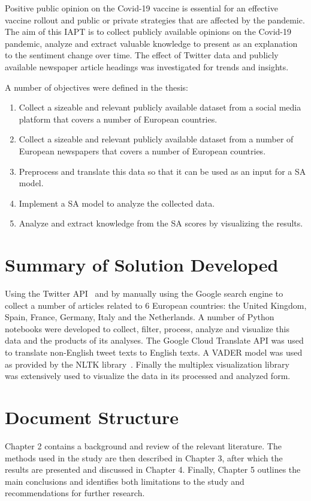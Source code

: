 Positive public opinion on the Covid-19 vaccine is essential for an effective vaccine rollout and public or private strategies that are affected by the pandemic.
The aim of this \ac{IAPT} is to collect publicly available opinions on the Covid-19 pandemic, analyze and extract valuable knowledge to present as an explanation to the sentiment change over time.
The effect of Twitter data and publicly available newspaper article headings was investigated for trends and insights.

\noindent A number of objectives were defined in the thesis:

\begin{enumerate}
  \item Collect a sizeable and relevant publicly available dataset from a social media platform that covers a number of European countries.
  \item Collect a sizeable and relevant publicly available dataset from a number of European newspapers that covers a number of European countries.
  \item Preprocess and translate this data so that it can be used as an input for a \ac{SA} model.
  \item Implement a \ac{SA} model to analyze the collected data.
  \item Analyze and extract knowledge from the \ac{SA} scores by visualizing the results.
\end{enumerate}

\section{Summary of Solution Developed}

Using the Twitter \ac{API}~\citep{roesslein2020tweepy} and by manually using the Google search engine to collect a number of articles related to 6 European countries: the United Kingdom, Spain, France, Germany, Italy and the Netherlands.
A number of Python notebooks were developed to collect, filter, process, analyze and visualize this data and the products of its analyses.
The Google Cloud Translate \ac{API} was used to translate non-English tweet texts to English texts.
A \ac{VADER} model was used as provided by the \ac{NLTK} library~\citep{bird2009natural}.
Finally the multiplex visualization library~\citep{Mamo2021} was extensively used to visualize the data in its processed and analyzed form.


\section{Document Structure}

Chapter 2 contains a background and review of the relevant literature.
The methods used in the study are then described in Chapter 3, after which the results are presented and discussed in Chapter 4.
Finally, Chapter 5 outlines the main conclusions and identifies both limitations to the study and recommendations for further research.

